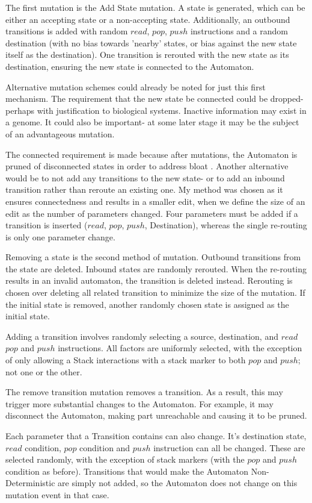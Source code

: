 \documentclass[a4paper,11pt,bcshonoursthesis,singlespace,oneside,thesisdraft,pdflatex]{cssethesis}
\begin{document}
The first mutation is the Add State mutation. A state is generated, which can be either an accepting state or a non-accepting state. Additionally, an outbound transitions is added with random $read$, $pop$, $push$ instructions and a random destination (with no bias towards 'nearby' states, or bias against the new state itself as the destination). One transition is rerouted with the new state as its destination, ensuring the new state is connected to the Automaton. 

Alternative mutation schemes could already be noted for just this first mechanism. 
The requirement that the new state be connected could be dropped- perhaps with justification to biological systems. Inactive information may exist in a genome. 
It could also be important- at some later stage it may be the subject of an advantageous mutation. 

The connected requirement is made because after mutations, the Automaton is pruned of disconnected states in order to address bloat \citep[][p 139]{koza}. 
Another alternative would be to not add any transitions to the new state- or to add an inbound transition rather than reroute an existing one. My method was chosen as it ensures connectedness and results in a smaller edit, when we define the size of an edit as the number of parameters changed. Four parameters must be added if a transition is inserted ($read$, $pop$, $push$, Destination), whereas the single re-routing is only one parameter change.

Removing a state is the second method of mutation. Outbound transitions from the state are deleted. 
Inbound states are randomly rerouted. When the re-routing results in an invalid automaton, the transition is deleted instead. Rerouting is chosen over deleting all related transition to minimize the size of the mutation. If the initial state is removed, another randomly chosen state is assigned as the initial state.

Adding a transition involves randomly selecting a source, destination, and $read$ $pop$ and $push$ instructions. All factors are uniformly selected, with the exception of only allowing a Stack interactions with a stack marker to both $pop$ and $push$; not one or the other. 

The remove transition mutation removes a transition. As a result, this may trigger more substantial changes to the Automaton. For example, it may disconnect the Automaton, making part unreachable and causing it to be pruned. 

Each parameter that a Transition contains can also change. It's destination state, $read$ condition, $pop$ condition and $push$ instruction can all be changed. These are selected randomly, with the exception of stack markers (with the $pop$ and $push$ condition as before). Transitions that would make the Automaton Non-Deterministic are simply not added, so the Automaton does not change on this mutation event in that case.
\end{document}
